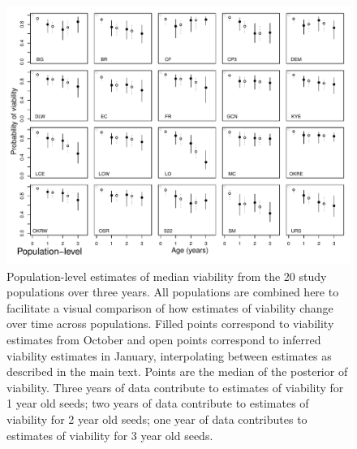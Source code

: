 \documentclass[12pt, oneside]{article}   	%
\begin{document}
 \begin{figure}[!h]
   \centering
       \includegraphics[page=2,width=1\textwidth]{../../figures/viability-estimates-population.pdf}  
    \caption{ Population-level estimates of median viability from the 20 study populations over three years. All populations are combined here to facilitate a visual comparison of how estimates of viability change over time across populations. Filled points correspond to viability estimates from October and open points correspond to inferred viability estimates in January, interpolating between estimates as described in the main text. Points are the median of the posterior of viability. Three years of data contribute to estimates of viability for 1 year old seeds; two years of data contribute to estimates of viability for 2 year old seeds; one year of data contributes to estimates of viability for 3 year old seeds.  }
 \label{fig:viability-estimates-population}
\end{figure}

\end{document}
